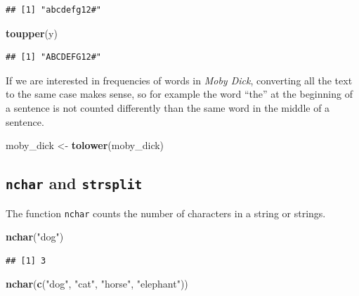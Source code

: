 \documentclass[
]{krantz}
\newenvironment{Shaded}{\begin{snugshade}}{\end{snugshade}}
\newcommand{\KeywordTok}[1]{\textcolor[rgb]{0.13,0.29,0.53}{\textbf{#1}}}
\newcommand{\NormalTok}[1]{#1}
\newcommand{\StringTok}[1]{\textcolor[rgb]{0.31,0.60,0.02}{#1}}
\begin{document}
\begin{verbatim}
## [1] "abcdefg12#"
\end{verbatim}

\begin{Shaded}
\begin{Highlighting}[]
\KeywordTok{toupper}\NormalTok{(y)}
\end{Highlighting}
\end{Shaded}

\begin{verbatim}
## [1] "ABCDEFG12#"
\end{verbatim}

If we are interested in frequencies of words in \emph{Moby Dick}, converting all the text to the same case makes sense, so for example the word ``the'' at the beginning of a sentence is not counted differently than the same word in the middle of a sentence.

\begin{Shaded}
\begin{Highlighting}[]
\NormalTok{moby\_dick \textless{}{-}}\StringTok{ }\KeywordTok{tolower}\NormalTok{(moby\_dick)}
\end{Highlighting}
\end{Shaded}

\hypertarget{nchar-and-strsplit}{%
\subsection{\texorpdfstring{\texttt{nchar} and \texttt{strsplit}}{nchar and strsplit}}\label{nchar-and-strsplit}}

The function \texttt{nchar} counts the number of characters in a string or strings.

\begin{Shaded}
\begin{Highlighting}[]
\KeywordTok{nchar}\NormalTok{(}\StringTok{"dog"}\NormalTok{)}
\end{Highlighting}
\end{Shaded}

\begin{verbatim}
## [1] 3
\end{verbatim}

\begin{Shaded}
\begin{Highlighting}[]
\KeywordTok{nchar}\NormalTok{(}\KeywordTok{c}\NormalTok{(}\StringTok{"dog"}\NormalTok{, }\StringTok{"cat"}\NormalTok{, }\StringTok{"horse"}\NormalTok{, }\StringTok{"elephant"}\NormalTok{))}
\end{Highlighting}
\end{Shaded}
\end{document}
